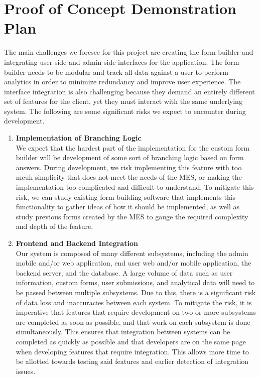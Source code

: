 \documentclass{article}
\begin{document}
\section{Proof of Concept Demonstration Plan}
\begin{flushleft}

The main challenges we foresee for this project are creating the form builder
and integrating user-side and admin-side interfaces for the application. The
form-builder needs to be modular and track all data against a user to perform
analytics in order to minimize redundancy and improve user experience. The
interface integration is also challenging because they demand an entirely
different set of features for the client, yet they must interact with the same
underlying system.
  \newline
  \newline
The following are some significant risks we expect to encounter during development.
\begin{enumerate}
  \item \textbf{Implementation of Branching Logic} \\
  We expect that the hardest part of the implementation for the custom form builder will be development of some sort of branching logic based on form answers. During development, we risk implementing this feature with too mcuh simplicity that does not meet the needs of the MES, or making the implementation too complicated and difficult to understand.
  \newline
  \newline
  To mitigate this risk, we can study existing form building software that implements this functionality to gather ideas of how it should be implemented, as well as study previous forms created by the MES to gauge the required complexity and depth of the feature.
  \item \textbf{Frontend and Backend Integration} \\
  Our system is composed of many different subsystems, including the admin mobile and/or web application, end user web and/or mobile application, the backend server, and the database. A large volume of data such as user information, custom forms, user submissions, and analytical data will need to be passed between multiple subsystems. Due to this, there is a significant risk of data loss and inaccuracies between each system.
  \newline
  \newline
  To mitigate the risk, it is imperative that features that require development on two or more subsystems are completed as soon as possible, and that work on each subsystem is done simultaneously. This ensures that integration between systems can be completed as quickly as possible and that developers are on the same page when developing features that require integration. This allows more time to be allotted towards testing said features and earlier detection of integration issues.

\end{enumerate}
\end{flushleft}
\end{document}
